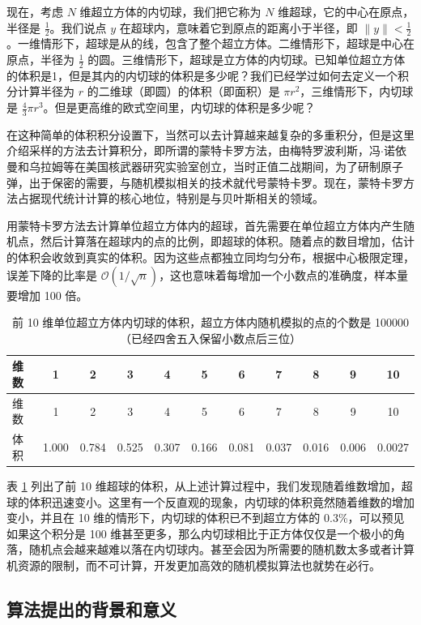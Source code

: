 \documentclass[12pt,a4paper,UTF8,twoside]{book}
\theoremstyle{definition}
\theoremstyle{definition}
\theoremstyle{definition}
\theoremstyle{remark}
\begin{document}
现在，考虑 \(N\) 维超立方体的内切球，我们把它称为 \(N\)
维超球，它的中心在原点，半径是 \(\frac{1}{2}\)。我们说点 \(y\)
在超球内，意味着它到原点的距离小于半径，即
\(\| y \| < \frac{1}{2}\)。一维情形下，超球是从的线，包含了整个超立方体。二维情形下，超球是中心在原点，半径为
\(\frac{1}{2}\)
的圆。三维情形下，超球是立方体的内切球。已知单位超立方体的体积是1，但是其内的内切球的体积是多少呢？我们已经学过如何去定义一个积分计算半径为
\(r\) 的二维球（即圆）的体积（即面积）是
\(\pi r^2\)，三维情形下，内切球是
\(\frac{4}{3}\pi r^3\)。但是更高维的欧式空间里，内切球的体积是多少呢？

在这种简单的体积积分设置下，当然可以去计算越来越复杂的多重积分，但是这里介绍采样的方法去计算积分，即所谓的蒙特卡罗方法，由梅特罗波利斯，冯\(\cdot\)诺依曼和乌拉姆等在美国核武器研究实验室创立，当时正值二战期间，为了研制原子弹，出于保密的需要，与随机模拟相关的技术就代号蒙特卡罗。现在，蒙特卡罗方法占据现代统计计算的核心地位，特别是与贝叶斯相关的领域。

用蒙特卡罗方法去计算单位超立方体内的超球，首先需要在单位超立方体内产生随机点，然后计算落在超球内的点的比例，即超球的体积。随着点的数目增加，估计的体积会收敛到真实的体积。因为这些点都独立同均匀分布，根据中心极限定理，误差下降的比率是
\(\mathcal{O}\left( 1 / \sqrt{n} \right)\)，这也意味着每增加一个小数点的准确度，样本量要增加
100 倍。

\begin{longtable}[]{@{}lcccccccccc@{}}
\caption{\label{tab:calculate-volume-of-hyperball} 前 10
维单位超立方体内切球的体积，超立方体内随机模拟的点的个数是
100000（已经四舍五入保留小数点后三位）}\tabularnewline
\toprule
维数 & 1 & 2 & 3 & 4 & 5 & 6 & 7 & 8 & 9 & 10\tabularnewline
\midrule
\endfirsthead
\toprule
维数 & 1 & 2 & 3 & 4 & 5 & 6 & 7 & 8 & 9 & 10\tabularnewline
\midrule
\endhead
体积 & 1.000 & 0.784 & 0.525 & 0.307 & 0.166 & 0.081 & 0.037 & 0.016 &
0.006 & 0.0027\tabularnewline
\bottomrule
\end{longtable}

表 \ref{tab:calculate-volume-of-hyperball} 列出了前 10
维超球的体积，从上述计算过程中，我们发现随着维数增加，超球的体积迅速变小。这里有一个反直观的现象，内切球的体积竟然随着维数的增加变小，并且在
10 维的情形下，内切球的体积已不到超立方体的
0.3\%，可以预见如果这个积分是 100
维甚至更多，那么内切球相比于正方体仅仅是一个极小的角落，随机点会越来越难以落在内切球内。甚至会因为所需要的随机数太多或者计算机资源的限制，而不可计算，开发更加高效的随机模拟算法也就势在必行。

\hypertarget{subsec:motivations}{%
\subsection{算法提出的背景和意义}\label{subsec:motivations}}
\end{document}
